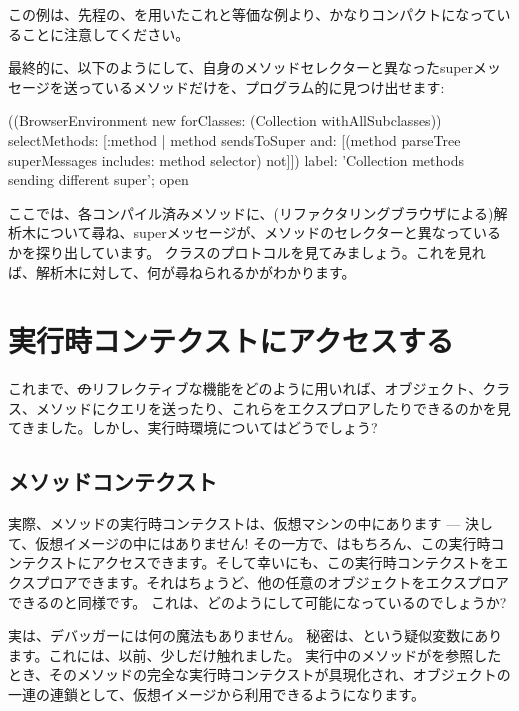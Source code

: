 \documentclass[a4paper,10pt,twoside]{book}
\begin{document}
この例は、先程の、を用いたこれと等価な例より、かなりコンパクトになっていることに注意してください。

最終的に、以下のようにして、自身のメソッドセレクターと異なったsuperメッセージを送っているメソッドだけを、プログラム的に見つけ出せます:
\begin{code}{}
((BrowserEnvironment new forClasses: (Collection withAllSubclasses))
	selectMethods: [:method | 
		method sendsToSuper
		and: [(method parseTree superMessages includes: method selector) not]])
	label: 'Collection methods sending different super';
	open
\end{code}
ここでは、各コンパイル済みメソッドに、(リファクタリングブラウザによる)解析木について尋ね、superメッセージが、メソッドのセレクターと異なっているかを探り出しています。
クラスのプロトコルを見てみましょう。これを見れば、解析木に対して、何が尋ねられるかがわかります。

\section{実行時コンテクストにアクセスする}

これまで、\st のリフレクティブな機能をどのように用いれば、オブジェクト、クラス、メソッドにクエリを送ったり、これらをエクスプロアしたりできるのかを見てきました。しかし、実行時環境についてはどうでしょう?

\subsection{メソッドコンテクスト}

実際、メソッドの実行時コンテクストは、仮想マシンの中にあります --- 決して、仮想イメージの中にはありません!
その一方で、はもちろん、この実行時コンテクストにアクセスできます。そして幸いにも、この実行時コンテクストをエクスプロアできます。それはちょうど、他の任意のオブジェクトをエクスプロアできるのと同様です。
これは、どのようにして可能になっているのでしょうか?

実は、デバッガーには何の魔法もありません。
秘密は、という疑似変数にあります。これには、以前、少しだけ触れました。
実行中のメソッドがを参照したとき、そのメソッドの完全な実行時コンテクストが具現化され、オブジェクトの一連の連鎖として、仮想イメージから利用できるようになります。
\end{document}
